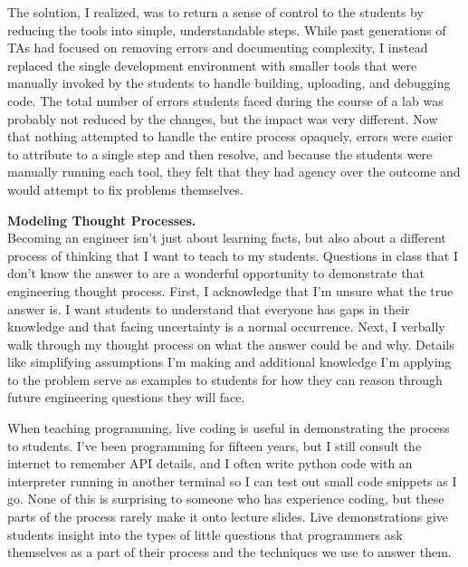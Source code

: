 \documentclass[12pt]{article} %
\begin{document}
The solution, I realized, was to return a sense of control to the students by
reducing the tools into simple, understandable steps. While past generations of
TAs had focused on removing errors and documenting complexity, I instead
replaced the single development environment with smaller tools that were
manually invoked by the students to handle building, uploading, and debugging
code. The total number of errors students faced during the course of a lab was
probably not reduced by the changes, but the impact was very different. Now
that nothing attempted to handle the entire process opaquely, errors were
easier to attribute to a single step and then resolve, and because the students
were manually running each tool, they felt that they had agency over the
outcome and would attempt to fix problems themselves.

\textbf{\textsf{\large Modeling Thought Processes.}}\\
Becoming an engineer isn't just about learning facts, but also about a
different process of thinking that I want to teach to my students. Questions in
class that I don't know the answer to are a wonderful opportunity to
demonstrate that engineering thought process. First, I acknowledge that I'm
unsure what the true answer is. I want students to understand that everyone has
gaps in their knowledge and that facing uncertainty is a normal occurrence.
Next, I verbally walk through my thought process on what the answer could be
and why. Details like simplifying assumptions I'm making and additional
knowledge I'm applying to the problem serve as examples to students for how
they can reason through future engineering questions they will face.

When teaching programming, live coding is useful in demonstrating the process
to students\footnotemark. I've been programming for fifteen years, but I still
consult the internet to remember API details, and I often write python code
with an interpreter running in another terminal so I can test out small code
snippets as I go. None of this is surprising to someone who has experience
coding, but these parts of the process rarely make it onto lecture slides. Live
demonstrations give students insight into the types of little questions that
programmers ask themselves as a part of their process and the techniques we use
to answer them.

\end{document}
